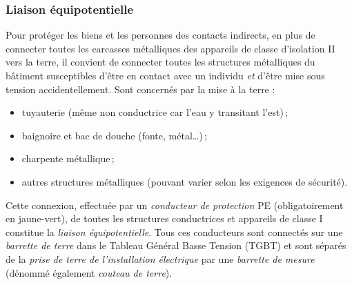 \subsubsection{Liaison équipotentielle}

Pour protéger les biens et les personnes des contacts indirects, en plus de connecter toutes les carcasses métalliques des appareils de classe d'isolation II vers la terre, il convient de connecter toutes les structures métalliques du bâtiment susceptibles d'être en contact avec un individu \emph{et} d'être mise sous tension accidentellement. Sont concernés par la mise à la terre  :
\begin{itemize}
\item tuyauterie (même non conductrice car l'eau y transitant l'est)\,;
\item baignoire et bac de douche (fonte, métal\ldots)\,;
\item charpente métallique\,;
\item autres structures métalliques (pouvant varier selon les exigences de sécurité).
\end{itemize}
Cette connexion, effectuée par un \emph{conducteur de protection} PE  (obligatoirement en jaune-vert), de toutes les structures conductrices et appareils de classe I constitue la \emph{liaison équipotentielle}. Tous ces conducteurs sont connectés sur une \emph{barrette de terre}  dans le Tableau Général Basse Tension (TGBT) et sont séparés de la \emph{prise de terre de l'installation électrique}  par une \emph{barrette de mesure}  (dénommé également \emph{couteau de terre}).\\

